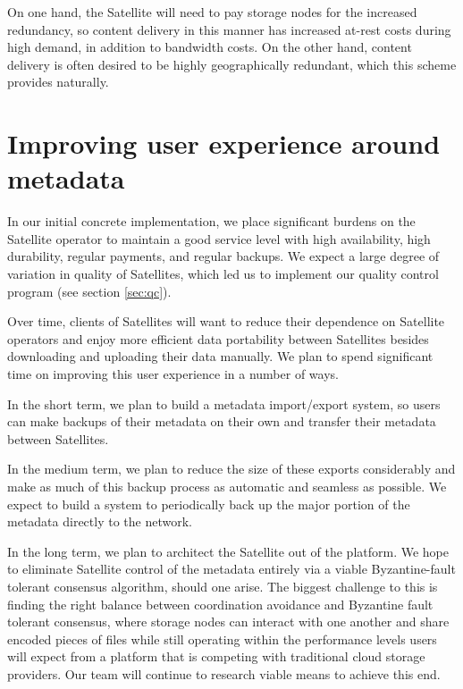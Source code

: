 \documentclass[8pt,fleqn,openany]{book}
\begin{document}
On one hand, the Satellite will need to pay storage nodes for the increased redundancy, so
content delivery in this manner has increased at-rest costs during high
demand, in addition to bandwidth costs. On the other hand, content delivery is often
desired to be highly geographically redundant, which this scheme provides
naturally.

\section{Improving user experience around metadata}\label{sec:distributed-metadata}

In our initial concrete implementation, we place significant burdens on the
Satellite operator to maintain a good service level with high availability,
high durability, regular payments, and regular backups. We expect a large
degree of variation in quality of Satellites, which led us to implement our quality
control program (see section \ref{sec:qc}).

Over time, clients of Satellites will want to reduce their dependence on Satellite
operators and enjoy more efficient data portability between Satellites besides
downloading and uploading their data manually. We plan to spend significant time
on improving this user experience in a number of ways.

In the short term, we plan to build a metadata import/export system, so users
can make backups of their metadata on their own and transfer their metadata
between Satellites.

In the medium term, we plan to reduce the size of these exports considerably
and make as much of this backup process as automatic and seamless as possible.
We expect to build a system to periodically back up the major portion of the metadata
directly to the network.

In the long term, we plan to architect the Satellite out of the platform.
We hope to eliminate Satellite control of the metadata
entirely via a viable Byzantine-fault tolerant consensus algorithm, should
one arise.
The biggest challenge to this is finding the right balance between coordination
avoidance and Byzantine fault tolerant consensus, where storage nodes can
interact with one another and share encoded pieces of files while still operating
within the performance levels users will expect from a platform that is
competing with traditional cloud storage providers.
Our team will continue to research viable means to achieve this end.
\end{document}
